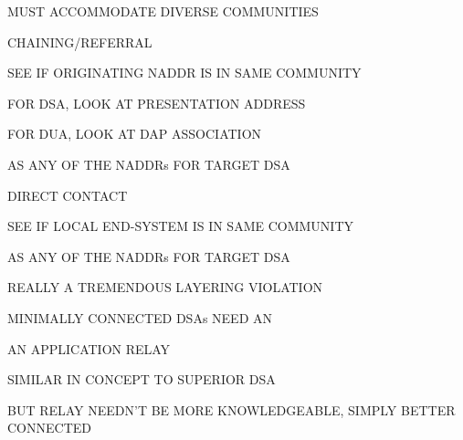 \begin{bwslide}

\begin{nrtc}
\item	MUST ACCOMMODATE DIVERSE COMMUNITIES

\item	CHAINING/REFERRAL
    \begin{nrtc}
    \item	SEE IF ORIGINATING NADDR IS IN SAME COMMUNITY

    \item	FOR DSA, LOOK AT PRESENTATION ADDRESS

    \item	FOR DUA, LOOK AT DAP ASSOCIATION
    \end{nrtc}
    AS ANY OF THE NADDRs FOR TARGET DSA

\item	DIRECT CONTACT
    \begin{nrtc}
    \item	SEE IF LOCAL END-SYSTEM IS IN SAME COMMUNITY
    \end{nrtc}
    AS ANY OF THE NADDRs FOR TARGET DSA

\item	REALLY A TREMENDOUS LAYERING VIOLATION
\end{nrtc}
\end{bwslide}


\begin{bwslide}

\begin{nrtc}
\item	MINIMALLY CONNECTED DSAs NEED AN
    \begin{nrtc}
    \item	AN APPLICATION RELAY
    \end{nrtc}

\item	SIMILAR IN CONCEPT TO SUPERIOR DSA
    \begin{nrtc}
    \item	BUT RELAY NEEDN'T BE MORE KNOWLEDGEABLE,
		SIMPLY BETTER CONNECTED
    \end{nrtc}
\end{nrtc}
\end{bwslide}


